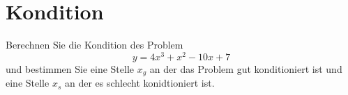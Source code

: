 
\section{Kondition}
Berechnen Sie die Kondition des Problem
$$
y=4x^3+x^2-10x+7
$$
und bestimmen Sie eine Stelle $x_g$ an der das Problem gut konditioniert ist und eine Stelle $x_s$ an der es schlecht konidtioniert ist.

